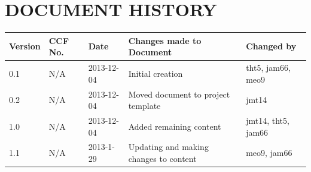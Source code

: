 \documentclass{project}
\begin{document}
\section*{DOCUMENT HISTORY}
\begin{tabular}{|l | l | l | l | l |}
\hline
Version & CCF No. & Date & Changes made to Document & Changed by \\
\hline
0.1 & N/A & 2013-12-04 & Initial creation & tht5, jam66, meo9 \\
\hline
0.2 & N/A & 2013-12-04 & Moved document to project template & jmt14 \\
\hline
1.0 & N/A & 2013-12-04 & Added remaining content & jmt14, tht5, jam66 \\
\hline
1.1 & N/A & 2013-1-29 & Updating and making changes to content & meo9, jam66 \\
\hline
\end{tabular}
\label{thelastpage}
\end{document}
